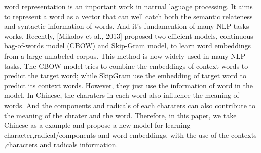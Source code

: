 word representation is an important work in natrual laguage processing. It aims to represent a word as a vector that can well catch both the semantic relateness and syntactic information of words. And it's fundamention of many NLP tasks works. 
Recently, [Mikolov et al., 2013] proposed two efficient models, continuous bag-of-words model (CBOW) and Skip-Gram model, to learn word embeddings from a large unlabeled corpus. This method is now widely used in many NLP tasks. The CBOW model tries to combine the embeddings of context words to predict the target word; while SkipGram use the embedding of target word to predict its context words. 
However, they just use the information of word in the model. In Chinese, the charaters in each word also influence the meaning of words. And the components and radicals of each charaters can also contribute to the meaning of the chrater and the word. Therefore, in this paper, we take Chinese as a example and propose a new model for learning character,radical/components and word embeddings, with the use of the contexts ,characters and radicals information.